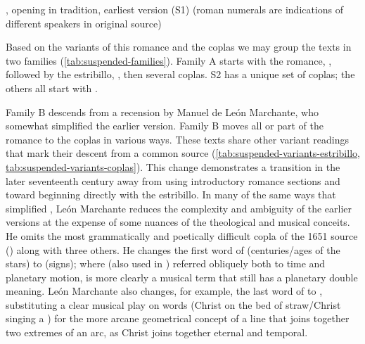 {, opening  in  tradition, earliest version (S1) (roman numerals are indications of
different speakers in original source)}

Based on the variants of this romance and the coplas we may group the
texts in two families (\cref{tab:suspended-families}).
Family A starts with the romance, ,
followed by the estribillo, ,
then several coplas.
S2 has a unique set of coplas; the others all start with .


Family B descends from a recension by Manuel de León Marchante, who somewhat
simplified the earlier version.%
    \citXXX[on Marchante]
Family B moves all or part of the romance to the coplas in various ways.
These texts share other variant readings that mark their descent from a common
source (\cref{tab:suspended-variants-estribillo, 
tab:suspended-variants-coplas}).
This change demonstrates a transition in the later seventeenth century away from
using introductory romance sections and toward beginning directly with
the estribillo.%
In many of the same ways that  simplified
, León Marchante reduces the complexity and
ambiguity of the earlier versions at the expense of some nuances of the
theological and musical conceits.
He omits the most grammatically and poetically difficult copla of the 1651
source () along with three others.
He changes the first word of  (centuries/ages of
the stars) to  (signs); where  (also used in
) referred obliquely both to time and planetary motion,
 is more clearly a musical term that still has a planetary
double meaning.
León Marchante also changes, for example, the last word of  to , substituting a clear musical play on words
(Christ  on the bed of straw/Christ singing a )
for the more arcane geometrical concept of a line that joins together two
extremes of an arc, as Christ joins together eternal and temporal.

